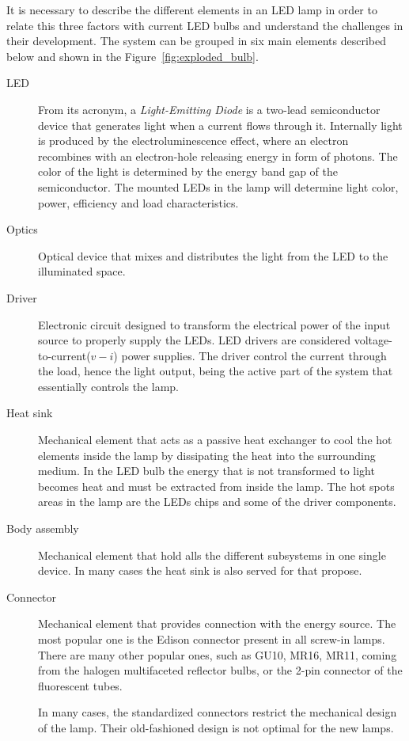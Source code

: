 It is necessary to describe the different elements in an LED lamp in order to relate this three factors with current LED bulbs and understand the challenges in their development. The system can be grouped in six main elements described below and shown in  the Figure~\ref{fig:exploded_bulb}.

\begin{description}
  \item[LED] From its acronym, a \emph{Light-Emitting Diode}  is a two-lead semiconductor device that generates light when a current flows through it. Internally light is produced by the electroluminescence effect, where an electron recombines with an electron-hole releasing energy in form of photons. The color of the light is determined by the energy band gap of the semiconductor. The mounted LEDs in the lamp will determine light color, power, efficiency and load characteristics.

  \item[Optics] Optical device that mixes and distributes the light from the LED to the illuminated space.

  \item[Driver] Electronic circuit designed to transform the electrical power of the input source to properly supply the LEDs. LED drivers are considered voltage-to-current($v-i$) power supplies.  The driver control the current through the load, hence the light output, being the active part of the system that essentially controls the lamp.

  \item[Heat sink] Mechanical element that acts as a passive heat exchanger to cool the hot elements inside the lamp by dissipating the heat into the surrounding medium. In the LED bulb the energy that is not transformed to light becomes heat and must be extracted from inside the lamp. The hot spots areas in the lamp are the LEDs chips and some of the driver components.

  \item[Body assembly] Mechanical element that hold alls the different subsystems in one single device. In many cases the heat sink is also served for that propose.

  \item[Connector] Mechanical element that provides connection with the energy source. The most popular one is the Edison connector present in all screw-in lamps. There are many other popular ones, such as GU10, MR16, MR11, coming from the halogen multifaceted reflector bulbs, or the 2-pin connector of the fluorescent tubes.

      In many cases, the standardized connectors restrict the mechanical design of the lamp. Their old-fashioned design is not optimal for the new lamps.
\end{description}

